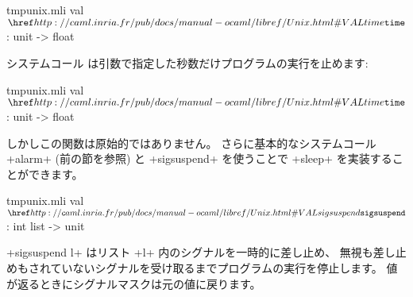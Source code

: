 %
\begin{listingcodefile}{tmpunix.mli}
val $\indexlibvalue{Unix}{time}$ : unit -> float
\end{listingcodefile}
%

システムコール  は引数で指定した秒数だけプログラムの実行を止めます:

%
\begin{listingcodefile}{tmpunix.mli}
val $\indexlibvalue{Unix}{time}$ : unit -> float
\end{listingcodefile}
%

しかしこの関数は原始的ではありません。
さらに基本的なシステムコール \ml+alarm+ (前の節を参照) と \ml+sigsuspend+ を使うことで
\ml+sleep+ を実装することができます。

%
\begin{listingcodefile}{tmpunix.mli}
val $\libvalue{Unix}{sigsuspend}$ : int list -> unit
\end{listingcodefile}
%

\ml+sigsuspend l+ はリスト \ml+l+ 内のシグナルを一時的に差し止め、
無視も差し止めもされていないシグナルを受け取るまでプログラムの実行を停止します。
値が返るときにシグナルマスクは元の値に戻ります。

